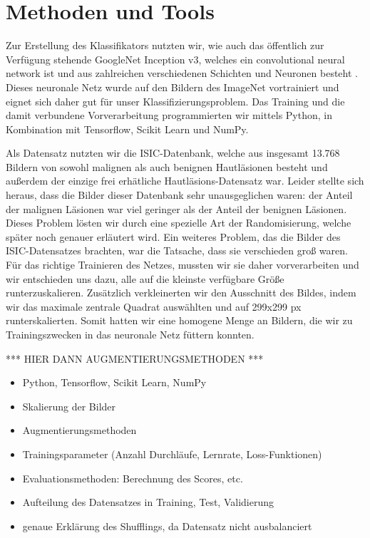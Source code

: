 \section{Methoden und Tools}

Zur Erstellung des Klassifikators nutzten wir, wie \citet{esteva2017dermatologist} auch das öffentlich zur Verfügung stehende GoogleNet Inception v3, welches ein convolutional neural network ist und aus zahlreichen verschiedenen Schichten und Neuronen besteht \citep{szegedy2016rethinking} . Dieses neuronale Netz wurde auf den Bildern des ImageNet vortrainiert \citep{russakovsky2015imagenet} und eignet sich daher gut für unser Klassifizierungsproblem. Das Training und die damit verbundene Vorverarbeitung programmierten wir mittels Python, in Kombination mit Tensorflow, Scikit Learn und NumPy. 

Als Datensatz nutzten wir die ISIC-Datenbank, welche aus insgesamt 13.768 Bildern von sowohl malignen als auch benignen Hautläsionen besteht und außerdem der einzige frei erhätliche Hautläsions-Datensatz war. Leider stellte sich heraus, dass die Bilder dieser Datenbank sehr unausgeglichen waren: der Anteil der malignen Läsionen war viel geringer als der Anteil der benignen Läsionen. Dieses Problem lösten wir durch eine spezielle Art der Randomisierung, welche später noch genauer erläutert wird. Ein weiteres Problem, das die Bilder des ISIC-Datensatzes brachten, war die Tatsache, dass sie verschieden groß waren. Für das richtige Trainieren des Netzes, mussten wir sie daher vorverarbeiten und wir entschieden uns dazu, alle auf die kleinste verfügbare Größe runterzuskalieren. Zusätzlich verkleinerten wir den Ausschnitt des Bildes, indem wir das maximale zentrale Quadrat auswählten und auf 299x299 px runterskalierten. Somit hatten wir eine homogene Menge an Bildern, die wir zu Trainingszwecken in das neuronale Netz füttern konnten. 

*** HIER DANN AUGMENTIERUNGSMETHODEN *** 




\begin{itemize}
	\item Python, Tensorflow, Scikit Learn, NumPy
	\item Skalierung der Bilder
	\item Augmentierungsmethoden
	\item Trainingsparameter (Anzahl Durchläufe, Lernrate, Loss-Funktionen)
	\item Evaluationsmethoden: Berechnung des Scores, etc.
	\item Aufteilung des Datensatzes in Training, Test, Validierung
	\item genaue Erklärung des Shufflings, da Datensatz nicht ausbalanciert
\end{itemize}

